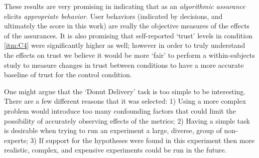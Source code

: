 These results are very promising in indicating that \famsec{} as an \emph{algorithmic assurance} elicits \emph{appropriate behavior}. User behaviors (indicated by decisions, and ultimately the score in this work) are really the objective measures of the effects of the assurances. It is also promising that self-reported `trust' levels in condition \ref{itm:C4} were significantly higher as well; however in order to truly understand the effects on trust we believe it would be more `fair' to perform a within-subjects study to measure changes in trust between conditions to have a more accurate baseline of trust for the control condition.

One might argue that the `Donut Delivery' task is too simple to be interesting. There are a few different reasons that it was selected: 1) Using a more complex problem would introduce too many confounding factors that could limit the possibility of accurately observing effects of the \famsec{} metrics; 2) Having a simple task is desirable when trying to run an experiment a large, diverse, group of non-experts; 3) If support for the hypotheses were found in this experiment then more realistic, complex, and expensive experiments could be run in the future.

%
